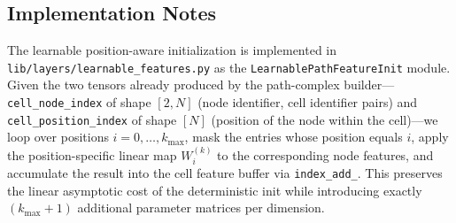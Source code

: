 \documentclass[letterpaper]{article} %
\begin{document}
\begin{table}[h]
\centering
{}
\caption{Per-seed test AUC on Cora for the four configurations. P = path lift; U = unified path\,+\,cellular lift; Det = deterministic init; Learn = learnable init. Per-seed values are rounded to three decimals; mean and standard deviation are computed from the unrounded values.}
\label{tab:per-seed}
\end{table}

\subsection{Implementation Notes} \label{app:impl}
The learnable position-aware initialization is implemented in \texttt{lib/layers/learnable\_features.py} as the \texttt{LearnablePathFeatureInit} module. Given the two tensors already produced by the path-complex builder---\texttt{cell\_node\_index} of shape \([2, N]\) (node identifier, cell identifier pairs) and \texttt{cell\_position\_index} of shape \([N]\) (position of the node within the cell)---we loop over positions \(i = 0, \ldots, k_\text{max}\), mask the entries whose position equals \(i\), apply the position-specific linear map \(W_i^{(k)}\) to the corresponding node features, and accumulate the result into the cell feature buffer via \texttt{index\_add\_}. This preserves the linear asymptotic cost of the deterministic init while introducing exactly \((k_\text{max} + 1)\) additional parameter matrices per dimension.
\end{document}
